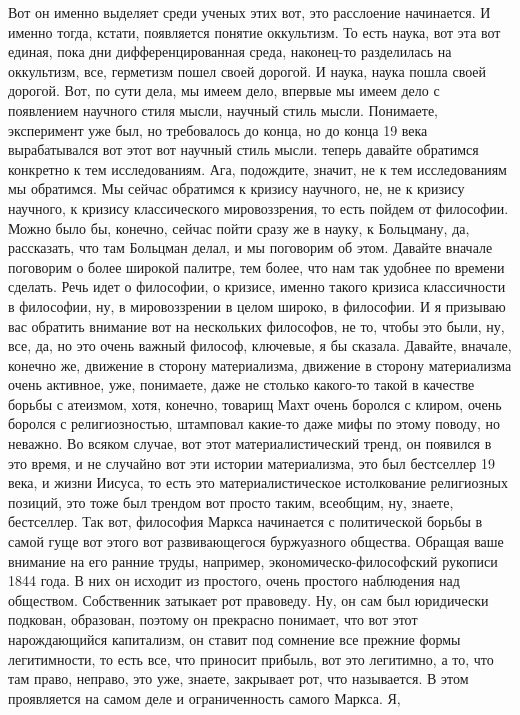 Вот он именно выделяет среди ученых этих вот, это расслоение начинается. И
именно тогда, кстати, появляется понятие оккультизм. То есть наука, вот эта вот
единая, пока дни дифференцированная среда, наконец-то разделилась на оккультизм,
все, герметизм пошел своей дорогой. И наука, наука пошла своей дорогой. Вот, по
сути дела, мы имеем дело, впервые мы имеем дело с появлением научного стиля
мысли, научный стиль мысли. Понимаете, эксперимент уже был, но требовалось до
конца, но до конца 19 века вырабатывался вот этот вот научный стиль мысли.
теперь давайте обратимся конкретно к тем исследованиям. Ага, подождите, значит,
не к тем исследованиям мы обратимся. Мы сейчас обратимся к кризису научного, не,
не к кризису научного, к кризису классического мировоззрения, то есть пойдем от
философии. Можно было бы, конечно, сейчас пойти сразу же в науку, к Больцману,
да, рассказать, что там Больцман делал, и мы поговорим об этом. Давайте вначале
поговорим о более широкой палитре, тем более, что нам так удобнее по времени
сделать. Речь идет о философии, о кризисе, именно такого кризиса классичности в
философии, ну, в мировоззрении в целом широко, в философии. И я призываю вас
обратить внимание вот на нескольких философов, не то, чтобы это были, ну, все,
да, но это очень важный философ, ключевые, я бы сказала. Давайте, вначале,
конечно же, движение в сторону материализма, движение в сторону материализма
очень активное, уже, понимаете, даже не столько какого-то такой в качестве
борьбы с атеизмом, хотя, конечно, товарищ Махт очень боролся с клиром, очень
боролся с религиозностью, штамповал какие-то даже мифы по этому поводу, но
неважно. Во всяком случае, вот этот материалистический тренд, он появился в это
время, и не случайно вот эти истории материализма, это был бестселлер 19 века, и
жизни Иисуса, то есть это материалистическое истолкование религиозных позиций,
это тоже был трендом вот просто таким, всеобщим, ну, знаете, бестселлер. Так
вот, философия Маркса начинается с политической борьбы в самой гуще вот этого
вот развивающегося буржуазного общества. Обращая ваше внимание на его ранние
труды, например, экономическо-философский рукописи 1844 года. В них он исходит
из простого, очень простого наблюдения над обществом. Собственник затыкает рот
правоведу. Ну, он сам был юридически подкован, образован, поэтому он прекрасно
понимает, что вот этот нарождающийся капитализм, он ставит под сомнение все
прежние формы легитимности, то есть все, что приносит прибыль, вот это
легитимно, а то, что там право, неправо, это уже, знаете, закрывает рот, что
называется. В этом проявляется на самом деле и ограниченность самого Маркса. Я,
